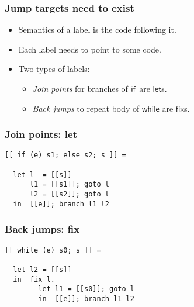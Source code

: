 \documentclass[t,fleqn,usenames,dvipsnames]{beamer}
\newcommand{\cAnn}{\color{red!80!black}}%
\renewcommand{\emph}[1]{{\cAnn#1}}
\newcommand{\cType}{\color{orange!60!black}}
\renewcommand{\emph}[1]{\textit{\cType#1}}
\newcommand{\twhile}{\mathsf{while}}
\newcommand{\tlet}{\mathsf{let}}
\newcommand{\tfix}{\mathsf{fix}}
\begin{document}
\begin{frame}[fragile=singleslide]
  \frametitle{Jump targets need to exist}
  \vspace{-3ex}
  \begin{itemize}
  \item Semantics of a label is the code following it.
  \item Each label needs to point to some code.
  \item Two types of labels:
    \begin{itemize}
    \item \emph{Join points} for branches of $\mathsf{if}$ are $\tlet$s.
    \item \emph{Back jumps} to repeat body of $\twhile$ are $\tfix$s.
    \end{itemize}
  \end{itemize}
\end{frame}

\begin{frame}[fragile=singleslide]
  \frametitle{Join points: let}
\begin{verbatim}
[[ if (e) s1; else s2; s ]] =

  let l  = [[s]]
      l1 = [[s1]]; goto l
      l2 = [[s2]]; goto l
  in  [[e]]; branch l1 l2
\end{verbatim}
\end{frame}


\begin{frame}[fragile=singleslide]
  \frametitle{Back jumps: fix}
\begin{verbatim}
[[ while (e) s0; s ]] =

  let l2 = [[s]]
  in  fix l.
        let l1 = [[s0]]; goto l
        in  [[e]]; branch l1 l2
\end{verbatim}
\end{frame}
\end{document}

